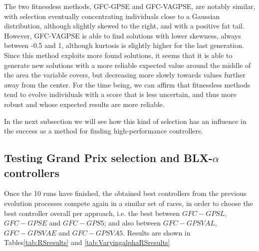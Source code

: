\documentclass[10pt,journal,compsoc]{IEEEtran}
\begin{document}
The two fitnessless methods, {\sf GFC-GPSE} and {\sf GFC-VAGPSE}, are
notably similar, with selection eventually concentrating individuals
close to a Gaussian distribution, although slightly skewed to the
right, and with a positive fat tail. However, {\sf GFC-VAGPSE} is able
to find solutions with lower skewness, always between -0.5 and 1,
although kurtosis is slightly higher for the last generation. Since
this method exploits more found solutions, it seems that it is able to
generate new solutions with a more reliable expected value around the
middle of the area the variable covers, but decreasing more slowly
towards values further away from the center. For the time being,
we can affirm that fitnessless methods tend to evolve individuals
with a score that is less uncertain, and thus more robust and whose
expected results are more reliable.

 In the next subsection we
will see how this kind of selection has an influence in the success as
a method for finding high-performance controllers.


\subsection{Testing Grand Prix selection and BLX-$\alpha$ controllers}


Once the 10 runs have finished, the obtained best controllers from the
previous evolution processes compete again in a similar set of races,
in order to choose the best controller overall per approach, i.e. the
best between $GFC-GPSL$, $GFC-GPSE$ and $GFC-GPS5$; and also between
$GFC-GPSVAL$,$GFC-GPSVAE$ and $GFC-GPSVA5$. 
Results are shown in Tables\ref{tab:RSresults} and \ref{tab:VaryingalphaRSresults}
\end{document}
